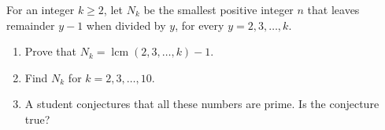 For an integer $k\ge2$, let $N_k$ be the smallest positive integer $n$ that leaves remainder $y-1$ when divided by $y$, for every $y=2,3,\dots,k$.
\begin{enumerate}
\item[(a)] Prove that $N_k=\operatorname{lcm}(2,3,\dots,k)-1$.
\item[(b)] Find $N_k$ for $k=2,3,\dots,10$.
\item[(c)] A student conjectures that all these numbers are prime. Is the conjecture true?
\end{enumerate}

